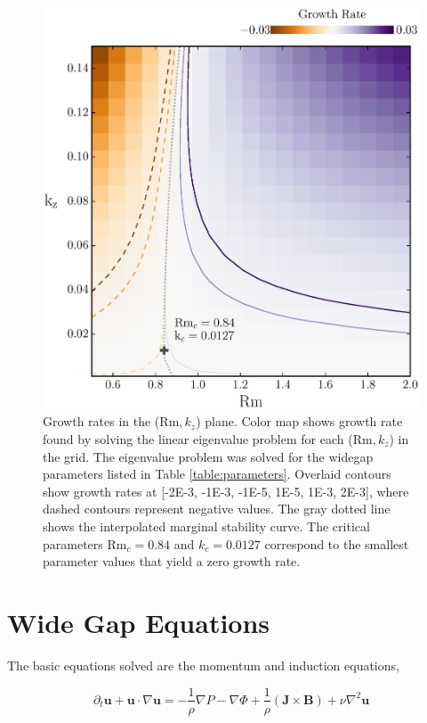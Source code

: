 \documentclass{emulateapj}
\newcommand{\beq}{\begin{equation}}
\newcommand{\eeq}{\end{equation}}
\newcommand\reym{\mathrm{Rm}}
\begin{document}
\begin{figure}
\centering
\includegraphics[width=\columnwidth]{../figures/widegap_paramspace_crit_params_Pm_1E-3}
\caption{Growth rates in the ($\reym, k_z$) plane. Color map shows growth rate found by solving the linear eigenvalue problem for each ($\reym, k_z$) in the grid. The eigenvalue problem was solved for the widegap parameters listed in Table \ref{table:parameters}. Overlaid contours show growth rates at [-2E-3, -1E-3, -1E-5, 1E-5, 1E-3, 2E-3], where dashed contours represent negative values. The gray dotted line shows the interpolated marginal stability curve. The critical parameters $\reym_c = 0.84$ and $k_c = 0.0127$ correspond to the smallest parameter values that yield a zero growth rate.}\label{fig:growth_rates}
\end{figure}

\section{Wide Gap Equations}

The basic equations solved are the momentum and induction equations,

\beq\label{momentum}
\partial_t \mathbf{u} + \mathbf{u} \cdot \nabla \mathbf{u} = -\frac{1}{\rho}\nabla P - \nabla\Phi + \frac{1}{\rho} \left(\mathbf{J}\times\mathbf{B}\right) + \nu\nabla^2 \mathbf{u} 
\eeq
\end{document}
